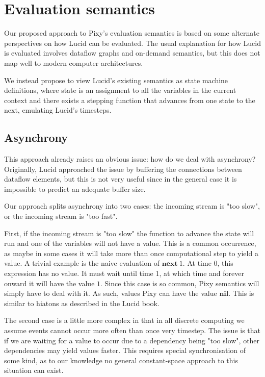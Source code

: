 \documentclass{scrartcl}
\begin{document}
    \section{Evaluation semantics}

    Our proposed approach to Pixy's evaluation semantics is based on some alternate perspectives on how Lucid can be evaluated. The usual explanation for how Lucid is evaluated involves dataflow graphs and on-demand semantics, but this does not map well to modern computer architectures.

    We instead propose to view Lucid's existing semantics as state machine definitions, where state is an assignment to all the variables in the current context and there exists a stepping function that advances from one state to the next, emulating Lucid's timesteps.

    \subsection{Asynchrony}

    This approach already raises an obvious issue: how do we deal with asynchrony? Originally, Lucid approached the issue by buffering the connections between dataflow elements, but this is not very useful since in the general case it is impossible to predict an adequate buffer size.

    Our approach splits asynchrony into two cases: the incoming stream is "too slow", or the incoming stream is "too fast".

    First, if the incoming stream is "too slow" the function to advance the state will run and one of the variables will not have a value. This is a common occurrence, as maybe in some cases it will take more than once computational step to yield a value. A trivial example is the naive evaluation of $\textbf{next}\ 1$. At time 0, this expression has no value. It must wait until time 1, at which time and forever onward it will have the value $1$. Since this case is so common, Pixy semantics will simply have to deal with it. As such, values Pixy can have the value $\textbf{nil}$. This is similar to hiatons as described in the Lucid book.

    The second case is a little more complex in that in all discrete computing we assume events cannot occur more often than once very timestep. The issue is that if we are waiting for a value to occur due to a dependency being "too slow", other dependencies may yield values faster. This requires special synchronisation of some kind, as to our knowledge no general constant-space approach to this situation can exist.
\end{document}
